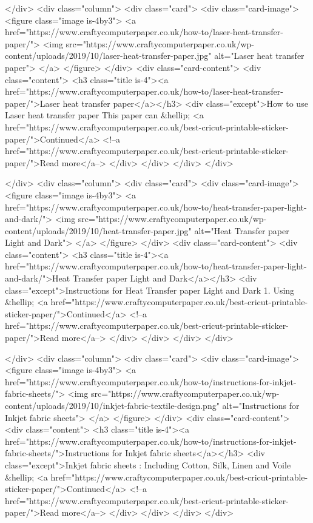     </div>
      <div class="column">
      <div class="card">
        <div class="card-image">
          <figure class="image is-4by3">
          <a href="https://www.craftycomputerpaper.co.uk/how-to/laser-heat-transfer-paper/">
                          <img src="https://www.craftycomputerpaper.co.uk/wp-content/uploads/2019/10/laser-heat-transfer-paper.jpg" alt="Laser heat transfer paper">
                      </a>
          </figure>
        </div>
        <div class="card-content">
          <div class="content">
            <h3 class="title is-4"><a href="https://www.craftycomputerpaper.co.uk/how-to/laser-heat-transfer-paper/">Laser heat transfer paper</a></h3>
            <div class="except">How to use Laser heat transfer paper This paper can &hellip; <a href="https://www.craftycomputerpaper.co.uk/best-cricut-printable-sticker-paper/">Continued</a> <!--a href="https://www.craftycomputerpaper.co.uk/best-cricut-printable-sticker-paper/">Read more</a--> </div>
          </div>
        </div>
      </div>

    </div>
      <div class="column">
      <div class="card">
        <div class="card-image">
          <figure class="image is-4by3">
          <a href="https://www.craftycomputerpaper.co.uk/how-to/heat-transfer-paper-light-and-dark/">
                          <img src="https://www.craftycomputerpaper.co.uk/wp-content/uploads/2019/10/heat-transfer-paper.jpg" alt="Heat Transfer paper Light and Dark">
                      </a>
          </figure>
        </div>
        <div class="card-content">
          <div class="content">
            <h3 class="title is-4"><a href="https://www.craftycomputerpaper.co.uk/how-to/heat-transfer-paper-light-and-dark/">Heat Transfer paper Light and Dark</a></h3>
            <div class="except">Instructions for Heat Transfer paper Light and Dark 1. Using &hellip; <a href="https://www.craftycomputerpaper.co.uk/best-cricut-printable-sticker-paper/">Continued</a> <!--a href="https://www.craftycomputerpaper.co.uk/best-cricut-printable-sticker-paper/">Read more</a--> </div>
          </div>
        </div>
      </div>

    </div>
      <div class="column">
      <div class="card">
        <div class="card-image">
          <figure class="image is-4by3">
          <a href="https://www.craftycomputerpaper.co.uk/how-to/instructions-for-inkjet-fabric-sheets/">
                          <img src="https://www.craftycomputerpaper.co.uk/wp-content/uploads/2019/10/inkjet-fabric-textile-design.png" alt="Instructions for Inkjet fabric sheets">
                      </a>
          </figure>
        </div>
        <div class="card-content">
          <div class="content">
            <h3 class="title is-4"><a href="https://www.craftycomputerpaper.co.uk/how-to/instructions-for-inkjet-fabric-sheets/">Instructions for Inkjet fabric sheets</a></h3>
            <div class="except">Inkjet fabric sheets : Including Cotton, Silk, Linen and Voile &hellip; <a href="https://www.craftycomputerpaper.co.uk/best-cricut-printable-sticker-paper/">Continued</a> <!--a href="https://www.craftycomputerpaper.co.uk/best-cricut-printable-sticker-paper/">Read more</a--> </div>
          </div>
        </div>
      </div>

